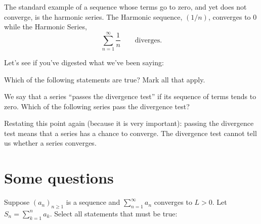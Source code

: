 \documentclass{ximera}
\begin{document}
The standard example of a sequence whose terms go to zero, and yet does
not converge, is the harmonic series. The Harmonic sequence,
$(1/n)$, converges to $0$ while the Harmonic Series,
\[
\sum_{n=1}^\infty\frac{1}{n}\qquad\text{diverges.}
\]

Let's see if you've digested what we've been saying:

\begin{question}
Which of the following statements are true?  Mark all that apply.
\begin{selectAll}
\end{selectAll}
\end{question}


\begin{question}
  We say that a series ``passes the divergence test'' if its sequence
  of terms tends to zero.  Which of the following series pass the
  divergence test?
\begin{selectAll}
\end{selectAll}
\end{question}

Restating this point again (because it is very important): passing the divergence test 
means that a series has a chance to converge.  The divergence test cannot tell us 
whether a series converges.


\section{Some questions}

\begin{question}
  Suppose $(a_n)_{n \geq 1}$ is a sequence and $\sum^{\infty}_{n= 1}
  a_n$ converges to $L>0$.  Let $S_n = \sum^n_{k=1} a_k$. Select all
  statements that must be true:
  \begin{selectAll}
  \end{selectAll}
\end{question}
\end{document}
